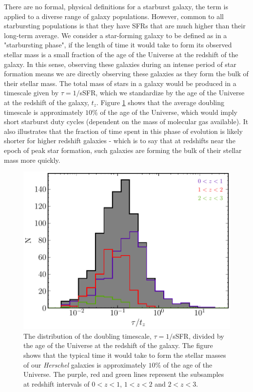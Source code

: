 There are no formal, physical definitions for a starburst galaxy, the term is applied to a diverse range of galaxy populations. However, common to all starbursting populations is that they have SFRs that are much higher than their long-term average. We consider a star-forming galaxy to be defined as in a "starbursting phase", if the length of time it would take to form its observed stellar mass is a small fraction of the age of the Universe at the redshift of the galaxy. In this sense, observing these galaxies during an intense period of star formation means we are directly observing these galaxies as they form the bulk of their stellar mass. The total mass of stars in a galaxy would be produced in a timescale given by $\tau = 1/$sSFR, which we standardize by the age of the Universe at the redshift of the galaxy, $t_z$. Figure \ref{fig:tau_against_age} shows that the average doubling timescale is approximately $10\%$ of the age of the Universe, which would imply short starburst duty cycles (dependent on the mass of molecular gas available). It also illustrates that the fraction of time spent in this phase of evolution is likely shorter for higher redshift galaxies - which is to say that at redshifts near the epoch of peak star formation, such galaxies are forming the bulk of their stellar mass more quickly.

\begin{figure}
	\centering
	\includegraphics[width=0.75\columnwidth]{Figures/tau_against_age.pdf}
	\caption{The distribution of the doubling timescale, $\tau = 1/$sSFR, divided by the age of the Universe at the redshift of the galaxy. The figure shows that the typical time it would take to form the stellar masses of our \textit{Herschel} galaxies is approximately $10\%$ of the age of the Universe. The purple, red and green lines represent the subsamples at redshift intervals of $0 < z < 1$, $1 < z < 2$ and $2 < z < 3$.}
	\label{fig:tau_against_age}
\end{figure}


